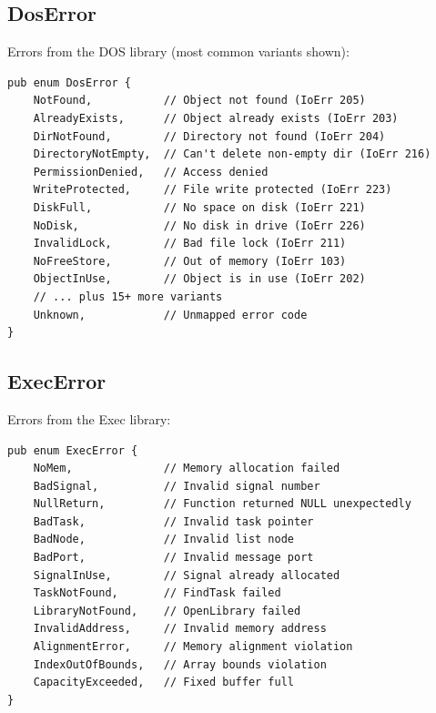 \begin{center}
\end{center}

\subsection{DosError}

Errors from the DOS library (most common variants shown):

\begin{lstlisting}
pub enum DosError {
    NotFound,           // Object not found (IoErr 205)
    AlreadyExists,      // Object already exists (IoErr 203)
    DirNotFound,        // Directory not found (IoErr 204)
    DirectoryNotEmpty,  // Can't delete non-empty dir (IoErr 216)
    PermissionDenied,   // Access denied
    WriteProtected,     // File write protected (IoErr 223)
    DiskFull,           // No space on disk (IoErr 221)
    NoDisk,             // No disk in drive (IoErr 226)
    InvalidLock,        // Bad file lock (IoErr 211)
    NoFreeStore,        // Out of memory (IoErr 103)
    ObjectInUse,        // Object is in use (IoErr 202)
    // ... plus 15+ more variants
    Unknown,            // Unmapped error code
}
\end{lstlisting}

\subsection{ExecError}

Errors from the Exec library:

\begin{lstlisting}
pub enum ExecError {
    NoMem,              // Memory allocation failed
    BadSignal,          // Invalid signal number
    NullReturn,         // Function returned NULL unexpectedly
    BadTask,            // Invalid task pointer
    BadNode,            // Invalid list node
    BadPort,            // Invalid message port
    SignalInUse,        // Signal already allocated
    TaskNotFound,       // FindTask failed
    LibraryNotFound,    // OpenLibrary failed
    InvalidAddress,     // Invalid memory address
    AlignmentError,     // Memory alignment violation
    IndexOutOfBounds,   // Array bounds violation
    CapacityExceeded,   // Fixed buffer full
}
\end{lstlisting}

